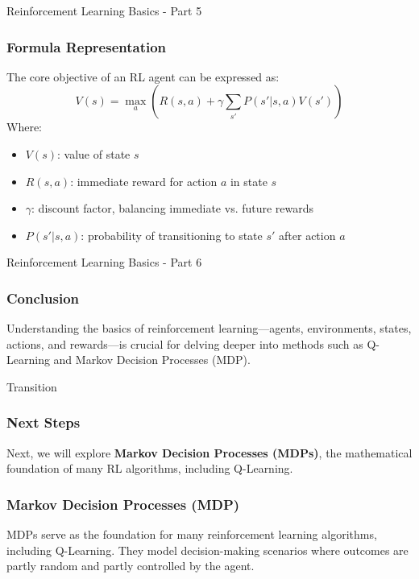 \documentclass[aspectratio=169]{beamer}
\begin{document}
\begin{frame}[fragile]{Reinforcement Learning Basics - Part 5}
    \frametitle{Formula Representation}
    The core objective of an RL agent can be expressed as:
    \begin{equation}
        V(s) = \max_{a} \left( R(s, a) + \gamma \sum_{s'} P(s' | s, a) V(s') \right)
    \end{equation}
    Where:
    \begin{itemize}
        \item \( V(s) \): value of state \( s \)
        \item \( R(s, a) \): immediate reward for action \( a \) in state \( s \)
        \item \( \gamma \): discount factor, balancing immediate vs. future rewards
        \item \( P(s' | s, a) \): probability of transitioning to state \( s' \) after action \( a \)
    \end{itemize}
\end{frame}

\begin{frame}[fragile]{Reinforcement Learning Basics - Part 6}
    \frametitle{Conclusion}
    Understanding the basics of reinforcement learning—agents, environments, states, actions, and rewards—is crucial for delving deeper into methods such as Q-Learning and Markov Decision Processes (MDP).
\end{frame}

\begin{frame}[fragile]{Transition}
    \frametitle{Next Steps}
    Next, we will explore \textbf{Markov Decision Processes (MDPs)}, the mathematical foundation of many RL algorithms, including Q-Learning.
\end{frame}

\begin{frame}[fragile]
    \frametitle{Markov Decision Processes (MDP)}
    MDPs serve as the foundation for many reinforcement learning algorithms, including Q-Learning. They model decision-making scenarios where outcomes are partly random and partly controlled by the agent.
\end{frame}
\end{document}
